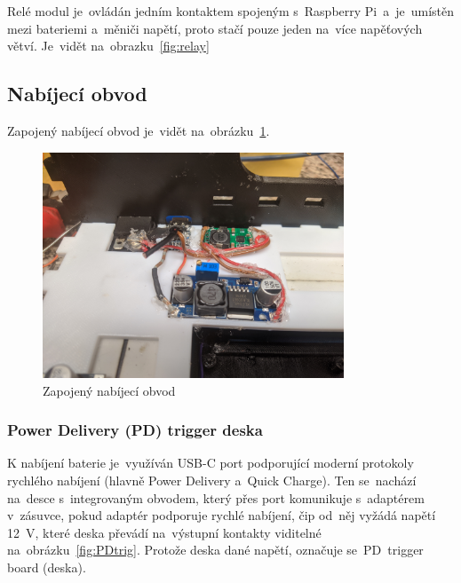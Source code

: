 Relé modul je~ovládán jedním kontaktem spojeným s~Raspberry Pi~a~je~umístěn mezi bateriemi a~měniči napětí, proto stačí pouze jeden na~více napěťových větví. Je~vidět na~obrazku~\ref{fig:relay}

\subsection{Nabíjecí obvod}
Zapojený nabíjecí obvod je~vidět na~obrázku~\ref{fig:hw_charging_circuit}.

\begin{figure}[htb]
  \centering
  \includegraphics[width=0.8\textwidth]{img/hw_charging_circuit.jpg}
  \caption{\label{fig:hw_charging_circuit} Zapojený nabíjecí obvod}
\end{figure}

\subsubsection{Power Delivery (PD) trigger deska}
K nabíjení baterie je~využíván USB-C port podporující moderní protokoly rychlého nabíjení (hlavně Power Delivery a~Quick Charge).
Ten se~nachází na~desce s~integrovaným obvodem, který přes port komunikuje s~adaptérem v~zásuvce, pokud adaptér podporuje rychlé nabíjení, čip od~něj vyžádá napětí 12~V, které deska převádí na~výstupní kontakty viditelné na~obrázku~\ref{fig:PDtrig}. Protože deska  dané napětí, označuje se~PD~trigger board (deska).

